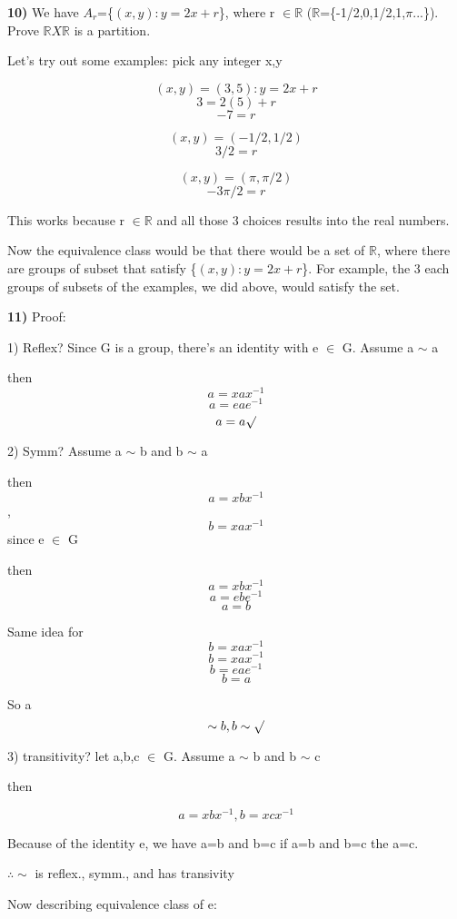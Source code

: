\documentclass{article}
\begin{document}
\textbf{10)}  We have $A_{r}$=\{$(x,y) : y=2x+r$\}, where r $\in \mathbb{R}$ ($\mathbb{R}$=\{-1/2,0,1/2,1,$\pi$...\}).
 Prove $\mathbb{R}X\mathbb{R}$ is a partition. 

\medskip

Let's try out some examples: pick any integer x,y 


$$(x,y)=(3,5): y=2x+r$$
$$3=2(5)+r$$
$$-7=r$$


$$(x,y)=(-1/2,1/2)$$
$$3/2=r$$

$$(x,y)=(\pi,\pi/2)$$
$$-3\pi/2=r$$

\medskip

This works because r $\in \mathbb{R}$ and all those 3 choices results into the real numbers.  

Now the equivalence class would be that there would be a set of $\mathbb{R}$, where there are groups of subset that satisfy \{$(x,y) : y=2x+r$\}. For example, the 3 each groups of subsets of the examples, we did above, would satisfy the set. 


\newpage

\textbf{11)} Proof:

\medskip

1) Reflex? Since G is a group, there's an identity with e $\in$ G. Assume a $\sim$ a

\medskip

then $$a=xax^{-1}$$
$$a=eae^{-1}$$
$$a=a \surd$$

2) Symm? Assume a $\sim$ b and b $\sim$ a

then $$a=xbx^{-1}$$ ,  $$b=xax^{-1}$$
since e $\in$ G 

then
$$a=xbx^{-1}$$
$$a=ebe^{-1}$$
$$a=b$$

Same idea for $$b=xax^{-1}$$
$$b=xax^{-1}$$
$$b=eae^{-1}$$
$$b=a$$

So a $$\sim b , b \sim \surd$$


3) transitivity? let a,b,c $\in$ G. Assume a $\sim$ b and b $\sim$ c

then 

$$a=xbx^{-1} ,  b=xcx^{-1}$$


Because of the identity e, we have a=b and b=c
if a=b and b=c
the a=c.



$\therefore \sim$ is reflex., symm., and has transivity

\medskip

Now describing equivalence class of e: 

\medskip
\end{document}

